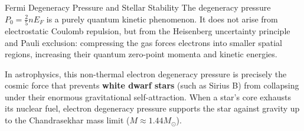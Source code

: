 \documentclass[11pt,a4paper]{article}
\begin{document}
\begin{takeawaybox}{Fermi Degeneracy Pressure and Stellar Stability}
The degeneracy pressure $P_0 = \frac{2}{5}n E_F$ is a purely quantum kinetic phenomenon. It does not arise from electrostatic Coulomb repulsion, but from the Heisenberg uncertainty principle and Pauli exclusion: compressing the gas forces electrons into smaller spatial regions, increasing their quantum zero-point momenta and kinetic energies.

In astrophysics, this non-thermal electron degeneracy pressure is precisely the cosmic force that prevents \textbf{white dwarf stars} (such as Sirius B) from collapsing under their enormous gravitational self-attraction. When a star's core exhausts its nuclear fuel, electron degeneracy pressure supports the star against gravity up to the Chandrasekhar mass limit ($M \approx 1.44 M_\odot$).
\end{takeawaybox}

\vspace{0.4cm}
\end{document}
